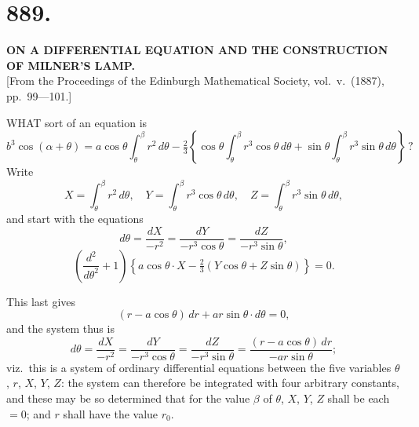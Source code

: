 \documentclass[11pt,a4paper]{article}
\begin{document}
\section*{889.}
\begin{center}
{\large\bfseries ON A DIFFERENTIAL EQUATION AND THE CONSTRUCTION OF MILNER'S LAMP.}\\[0.5em]
\small [From the Proceedings of the Edinburgh Mathematical Society, vol.\ v.\ (1887), pp.\ 99---101.]
\end{center}

WHAT sort of an equation is
\begin{equation}
b^3 \cos(\alpha + \theta) = a\cos\theta \int_\theta^\beta r^2\,d\theta - \tfrac{2}{3}\left\{\cos\theta \int_\theta^\beta r^3\cos\theta\,d\theta + \sin\theta \int_\theta^\beta r^3\sin\theta\,d\theta\right\}\,? \tag{1}
\end{equation}
Write
\begin{equation}
X = \int_\theta^\beta r^2\,d\theta,\quad Y = \int_\theta^\beta r^3\cos\theta\,d\theta,\quad Z = \int_\theta^\beta r^3\sin\theta\,d\theta, \tag{2}
\end{equation}
and start with the equations
\begin{equation}
d\theta = \frac{dX}{-r^2} = \frac{dY}{-r^3\cos\theta} = \frac{dZ}{-r^3\sin\theta}, \tag{3}
\end{equation}
\begin{equation}
\left(\frac{d^2}{d\theta^2} + 1\right)\left\{a\cos\theta\cdot X - \tfrac{2}{3}(Y\cos\theta + Z\sin\theta)\right\} = 0. \tag{4}
\end{equation}

This last gives
\begin{equation}
(r - a\cos\theta)\,dr + ar\sin\theta\cdot d\theta = 0, \tag{5}
\end{equation}
and the system thus is
\[
d\theta = \frac{dX}{-r^2} = \frac{dY}{-r^3\cos\theta} = \frac{dZ}{-r^3\sin\theta} = \frac{(r-a\cos\theta)\,dr}{-ar\sin\theta};
\]
viz.\ this is a system of ordinary differential equations between the five variables $\theta$, $r$, $X$, $Y$, $Z$: the system can therefore be integrated with four arbitrary constants, and these may be so determined that for the value $\beta$ of $\theta$, $X$, $Y$, $Z$ shall be each $=0$; and $r$ shall have the value $r_0$.
\end{document}
